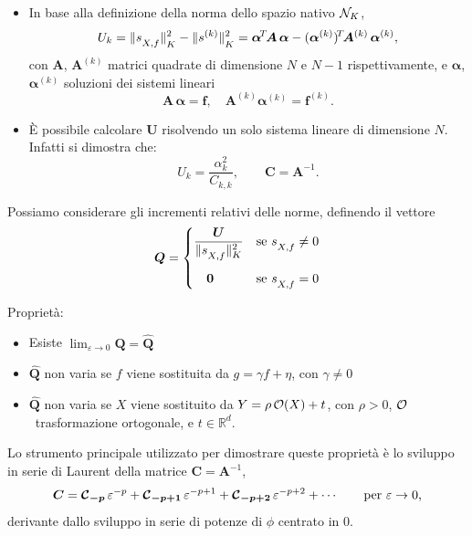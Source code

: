 \documentclass[10pt]{beamer}
\theoremstyle{definition}
\theoremstyle{plain}
\def\R{\mathbb R}
\def\Cal#1{{\cal #1}}
\def\norm#1{\Vert #1\Vert}
\def\hbyw#1#2{\vbox to #1{\vfil \hbox to #2{\hfil}}}
\def\lK{{\lower.5ex\hbox{$\scriptstyle K$}}}
\def\lXf{{\lower.5ex\hbox{$\scriptstyle X, f$}}}
\begin{document}
\begin{frame}
\begin{itemize}
\item In base alla definizione della norma dello spazio nativo $\Cal N_K$,
$$
U_k = \norm{s_\lXf}^2_\lK - \norm{s^{(k)}}^2_\lK = \bm \alpha^{\!T\!}\bm A\,\bm\alpha - (\bm\alpha^{(k)})^{\!T\!}\bm A^{(k)}\,\bm\alpha^{(k)},
$$
con $\bm A$,  $\bm A^{(k)}$ matrici quadrate di dimensione $N$ e $N-1$ rispettivamente, e $\bm\alpha$, $\bm\alpha^{(k)}$ soluzioni dei sistemi lineari
$$
\bm A\,\bm\alpha =\bm f,\quad \bm A^{(k)} \bm\alpha^{(k)} = \bm f^{(k)}.
$$ 


\item
È possibile calcolare $\bm U$ risolvendo un solo sistema lineare di dimensione $N$.  Infatti si dimostra che:
$$
U_k = \frac{\alpha_k^2}{C_{k,k}}, \qquad \bm C = \bm A^{-1}.
$$
\end{itemize}
\end{frame}

\begin{frame}
Possiamo considerare gli incrementi relativi delle norme, definendo il vettore
$$
\bm Q = \begin{cases}\displaystyle
			\frac{\bm U}{\norm{s_\lXf}^2_K} & \text{se $s_\lXf \neq 0$}\\
			\hbyw{4ex}{1em}\bm 0 & \text{se $s_\lXf = 0$}
	       \end{cases}
$$

\alert{Proprietà}:
\begin{itemize}
\item Esiste $\lim_{\varepsilon\to 0} \bm Q = \widehat{\bm Q}$
\item $\widehat{\bm Q}$ non varia se $f$ viene sostituita da $g = \gamma f + \eta$, con $\gamma\neq 0$
\item $\widehat{\bm Q}$ non varia se $X$ viene sostituito da $Y = \rho\, \Cal O(X) + t$, con $\rho>0$,  $\Cal O$~trasformazione ortogonale, e $t\in\R^d$.
\end{itemize}

Lo strumento principale utilizzato per dimostrare queste proprietà è lo sviluppo in serie di Laurent della matrice $\bm C = \bm A^{-1}$, 
$$
\bm C = \bm{\Cal C}_{\bm{-p}}\,\varepsilon^{-p} + \bm{\Cal C}_{\bm{-p+1}}\,\varepsilon^{-p+1} +  \bm{\Cal C}_{\bm{-p+2}}\,\varepsilon^{-p+2}+\cdots\qquad \text{per $\varepsilon\to0$,}
$$
derivante dallo sviluppo in serie di potenze di $\phi$ centrato in $0$.

\end{frame}
\end{document}
